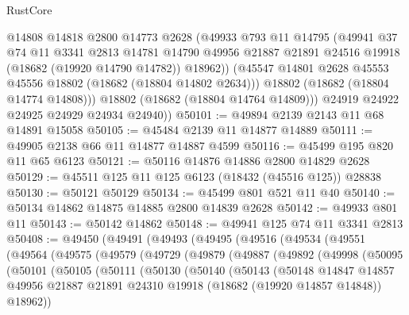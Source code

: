\begin{lexlean}{RustCore}
\begin{coremodule}
            @14808
            @14818
            @2800
            @14773
            @2628
            (@49933
              @793
              @11
              @14795
              (@49941
                @37
                @74
                @11
                @3341
                @2813
                @14781
                @14790
                @49956
                @21887
                @21891
                @24516
                @19918
                (@18682 (@19920 @14790 @14782))
                @18962))
            (@45547 @14801 @2628 @45553 @45556 @18802 (@18682 (@18804 @14802 @2634)))
            @18802
            (@18682 (@18804 @14774 @14808)))
          @18802
          (@18682 (@18804 @14764 @14809)))
        @24919
        @24922
        @24925
        @24929
        @24934
        @24940))
@50101 := @49894 @2139 @2143 @11 @68 @14891 @15058
@50105 := @45484 @2139 @11 @14877 @14889
@50111 := @49905 @2138 @66 @11 @14877 @14887 @4599
@50116 := @45499 @195 @820 @11 @65 @6123
@50121 := @50116 @14876 @14886 @2800 @14829 @2628
@50129 := @45511 @125 @11 @125 @6123 (@18432 (@45516 @125)) @28838
@50130 := @50121 @50129
@50134 := @45499 @801 @521 @11 @40
@50140 := @50134 @14862 @14875 @14885 @2800 @14839 @2628
@50142 := @49933 @801 @11
@50143 := @50142 @14862
@50148 := @49941 @125 @74 @11 @3341 @2813
@50408 := @49450
    (@49491
      (@49493
        (@49495
          (@49516
            (@49534
              (@49551
                (@49564
                  (@49575
                    (@49579
                      (@49729
                        (@49879
                          (@49887
                            (@49892
                              (@49998
                                (@50095
                                  (@50101
                                    (@50105
                                      (@50111
                                        (@50130
                                          (@50140
                                            (@50143
                                              (@50148
                                                @14847
                                                @14857
                                                @49956
                                                @21887
                                                @21891
                                                @24310
                                                @19918
                                                (@18682 (@19920 @14857 @14848))
                                                @18962))

\end{coremodule}
\end{lexlean}
